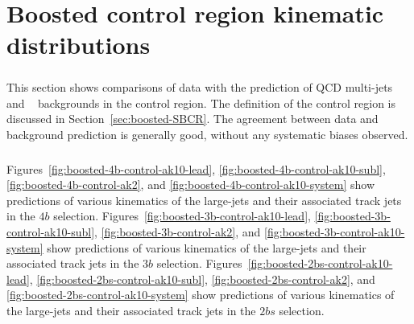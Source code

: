 \chapter{Boosted control region kinematic distributions}
\label{AppendixCR}

\paragraph{}
This section shows comparisons of data with the prediction of QCD multi-jets and \ttbar~ backgrounds in the control region. 
The definition of the control region is discussed in Section~\ref{sec:boosted-SBCR}.
The agreement between data and background prediction is generally good, without any systematic biases observed.

\paragraph{}
Figures~\ref{fig:boosted-4b-control-ak10-lead}, \ref{fig:boosted-4b-control-ak10-subl}, \ref{fig:boosted-4b-control-ak2}, and \ref{fig:boosted-4b-control-ak10-system} show predictions of various kinematics of the large-\R jets and their associated track jets in the $4b$ selection. 
Figures~\ref{fig:boosted-3b-control-ak10-lead}, \ref{fig:boosted-3b-control-ak10-subl}, \ref{fig:boosted-3b-control-ak2},  and \ref{fig:boosted-3b-control-ak10-system} show predictions of various kinematics of the large-\R jets and their associated track jets in the $3b$ selection. 
Figures~\ref{fig:boosted-2bs-control-ak10-lead}, \ref{fig:boosted-2bs-control-ak10-subl}, \ref{fig:boosted-2bs-control-ak2},  and \ref{fig:boosted-2bs-control-ak10-system} show predictions of various kinematics of the large-\R jets and their associated track jets in the $2bs$ selection.

